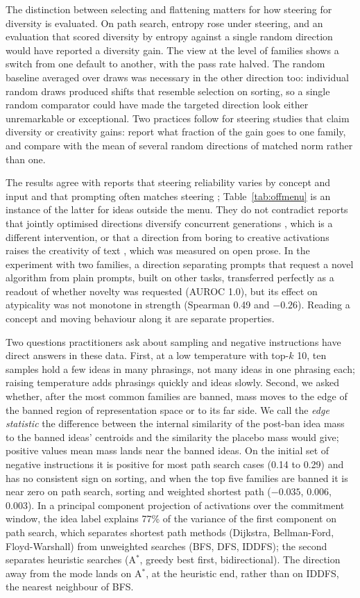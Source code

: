 \documentclass[11pt,letterpaper]{article}
\newcommand{\Astar}{A$^{*}$}
\begin{document}
The distinction between selecting and flattening matters for how steering for diversity is evaluated. On path search, entropy rose under steering, and an evaluation that scored diversity by entropy against a single random direction would have reported a diversity gain. The view at the level of families shows a switch from one default to another, with the pass rate halved. The random baseline averaged over draws was necessary in the other direction too: individual random draws produced shifts that resemble selection on sorting, so a single random comparator could have made the targeted direction look either unremarkable or exceptional. Two practices follow for steering studies that claim diversity or creativity gains: report what fraction of the gain goes to one family, and compare with the mean of several random directions of matched norm rather than one.

The results agree with reports that steering reliability varies by concept and input \citep{Tan2024} and that prompting often matches steering \citep{Wu2025}; Table~\ref{tab:offmenu} is an instance of the latter for ideas outside the menu. They do not contradict reports that jointly optimised directions diversify concurrent generations \citep{Zhu2026,Khanh2025}, which is a different intervention, or that a direction from boring to creative activations raises the creativity of text \citep{Olson2024}, which was measured on open prose. In the experiment with two families, a direction separating prompts that request a novel algorithm from plain prompts, built on other tasks, transferred perfectly as a readout of whether novelty was requested (AUROC 1.0), but its effect on atypicality was not monotone in strength (Spearman 0.49 and $-0.26$). Reading a concept and moving behaviour along it are separate properties.

Two questions practitioners ask about sampling and negative instructions have direct answers in these data. First, at a low temperature with top-$k$ 10, ten samples hold a few ideas in many phrasings, not many ideas in one phrasing each; raising temperature adds phrasings quickly and ideas slowly. Second, we asked whether, after the most common families are banned, mass moves to the edge of the banned region of representation space or to its far side. We call the \emph{edge statistic} the difference between the internal similarity of the post-ban idea mass to the banned ideas' centroids and the similarity the placebo mass would give; positive values mean mass lands near the banned ideas. On the initial set of negative instructions it is positive for most path search cases (0.14 to 0.29) and has no consistent sign on sorting, and when the top five families are banned it is near zero on path search, sorting and weighted shortest path ($-0.035$, 0.006, 0.003). In a principal component projection of activations over the commitment window, the idea label explains 77\% of the variance of the first component on path search, which separates shortest path methods (Dijkstra, Bellman-Ford, Floyd-Warshall) from unweighted searches (BFS, DFS, IDDFS); the second separates heuristic searches (\Astar{}, greedy best first, bidirectional). The direction away from the mode lands on \Astar{}, at the heuristic end, rather than on IDDFS, the nearest neighbour of BFS.
\end{document}
